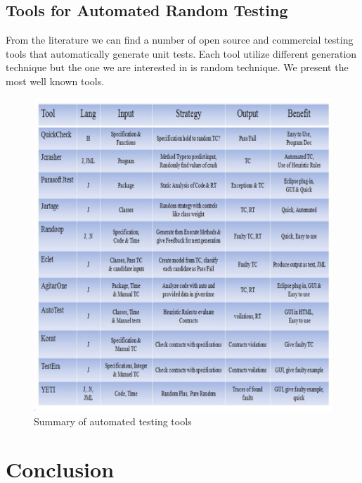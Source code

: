 \subsection{Tools for Automated Random Testing}
From the literature we can find a number of open source and commercial testing tools that automatically generate unit tests. Each tool utilize different generation technique but the one we are interested in is random technique. We present the most well known tools.

\begin{figure}[h]
	\centering
	\includegraphics[scale=0.6]{Literature/tools}
	\caption{Summary of automated testing tools}
\end{figure}


\section{Conclusion}




